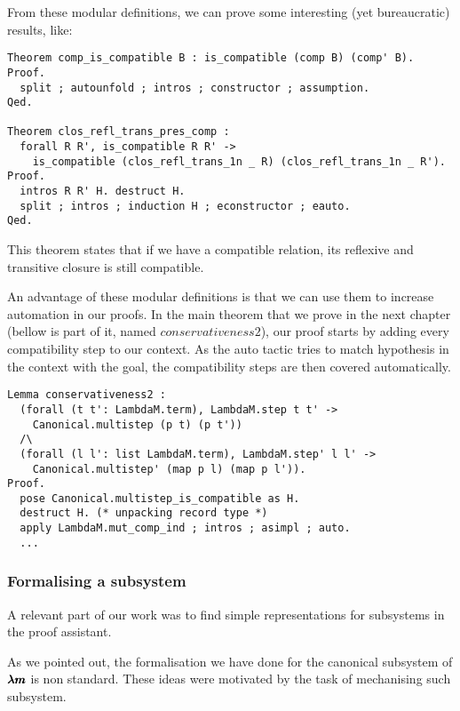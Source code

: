 From these modular definitions, we can prove some interesting (yet bureaucratic) results, like:

\begin{lstlisting}[language=Coq]
Theorem comp_is_compatible B : is_compatible (comp B) (comp' B).
Proof.
  split ; autounfold ; intros ; constructor ; assumption.
Qed.

Theorem clos_refl_trans_pres_comp :
  forall R R', is_compatible R R' ->
    is_compatible (clos_refl_trans_1n _ R) (clos_refl_trans_1n _ R').
Proof.
  intros R R' H. destruct H. 
  split ; intros ; induction H ; econstructor ; eauto.
Qed.
\end{lstlisting}

This theorem states that if we have a compatible relation, its reflexive and transitive closure is still compatible.

An advantage of these modular definitions is that we can use them to increase automation in our proofs.
In the main theorem that we prove in the next chapter (bellow is part of it, named \lst$conservativeness2$), our proof starts by adding every compatibility step to our context.
As the auto tactic tries to match hypothesis in the context with the goal, the compatibility steps are then covered automatically.

\begin{lstlisting}[language=Coq]
Lemma conservativeness2 :
  (forall (t t': LambdaM.term), LambdaM.step t t' ->
    Canonical.multistep (p t) (p t'))
  /\
  (forall (l l': list LambdaM.term), LambdaM.step' l l' ->
    Canonical.multistep' (map p l) (map p l')).
Proof.
  pose Canonical.multistep_is_compatible as H.
  destruct H. (* unpacking record type *)
  apply LambdaM.mut_comp_ind ; intros ; asimpl ; auto.
  ...
\end{lstlisting}



\subsubsection{Formalising a subsystem}

A relevant part of our work was to find simple representations for subsystems in the proof assistant.

As we pointed out, the formalisation we have done for the canonical subsystem of $\pmb{\lambda m}$ is non standard.
These ideas were motivated by the task of mechanising such subsystem.


